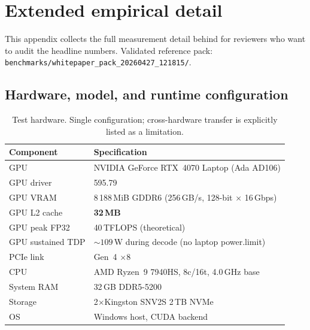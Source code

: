 \documentclass[11pt]{article}
\begin{document}
\section{Extended empirical detail}
\label{app:extended}

This appendix collects the full measurement detail behind
 for reviewers who want to
audit the headline numbers. Validated reference pack:
\texttt{benchmarks/whitepaper\_pack\_20260427\_121815/}.

\subsection{Hardware, model, and runtime configuration}

\begin{table}[h]\centering\footnotesize
\caption{Test hardware. Single configuration; cross-hardware transfer is
explicitly listed as a limitation.}
\begin{tabular}{@{}ll@{}}
\toprule
\textbf{Component} & \textbf{Specification}\\
\midrule
GPU                 & NVIDIA GeForce RTX~4070 Laptop (Ada AD106)\\
GPU driver          & 595.79\\
GPU VRAM            & 8\,188\,MiB GDDR6 (256\,GB/s, 128-bit $\times$ 16\,Gbps)\\
GPU L2 cache        & \textbf{32\,MB}\\
GPU peak FP32       & 40\,TFLOPS (theoretical)\\
GPU sustained TDP   & ${\sim}109$\,W during decode (no laptop power.limit)\\
PCIe link           & Gen~4 $\times$8\\
CPU                 & AMD Ryzen~9 7940HS, 8c/16t, 4.0\,GHz base\\
System RAM          & 32\,GB DDR5-5200\\
Storage             & 2$\times$Kingston SNV2S 2\,TB NVMe\\
OS                  & Windows host, CUDA backend\\
\bottomrule
\end{tabular}
\end{table}
\end{document}
